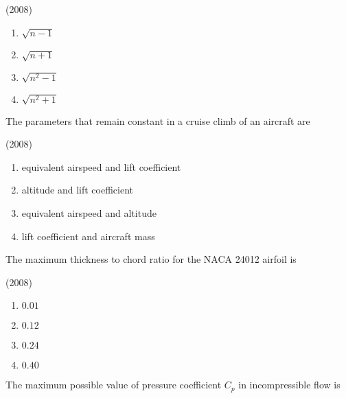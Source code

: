     \hfill{(2008)}

        \begin{multicols}{4}
            \begin{enumerate}
                \item $\sqrt{n-1}$
                \item $\sqrt{n+1}$
                \item $\sqrt{n^2-1}$
                \item $\sqrt{n^2+1}$
            \end{enumerate}
        \end{multicols}
		
    \item The parameters that remain constant in a cruise climb of an aircraft are 
    
    \hfill{(2008)}

        \begin{multicols}{2}
            \begin{enumerate}
                \item equivalent airspeed and lift coefficient
                \item altitude and lift coefficient
                \item equivalent airspeed and altitude
                \item lift coefficient and aircraft mass
            \end{enumerate}
        \end{multicols}

    \item The maximum thickness to chord ratio for the NACA 24012 airfoil is
    
    \hfill{(2008)}

        \begin{multicols}{4}
            \begin{enumerate}
                \item $0.01$
                \item $0.12$
                \item $0.24$
                \item $0.40$
            \end{enumerate}
        \end{multicols}

    \item The maximum possible value of pressure coefficient $C_p$ in incompressible flow is
    
